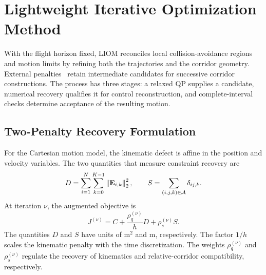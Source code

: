 \section{Lightweight Iterative Optimization Method}
\label{sec:liom}
With the flight horizon fixed, LIOM reconciles local collision-avoidance regions and motion limits by refining both the trajectories and the corridor geometry. External penalties~\cite{li2022liom} retain intermediate candidates for successive corridor constructions. The process has three stages: a relaxed QP supplies a candidate, numerical recovery qualifies it for control reconstruction, and complete-interval checks determine acceptance of the resulting motion.

\subsection{Two-Penalty Recovery Formulation}
For the Cartesian motion model, the kinematic defect is affine in the position and velocity variables. The two quantities that measure constraint recovery are
\begin{equation}
 D=\sum_{i=1}^N\sum_{k=0}^{K-1}\left\lVert \mathbf E_{i,k}\right\rVert_2^2,\qquad
 S=\sum_{(i,j,k)\in\mathcal A}\delta_{ij,k}.
 \label{eq:recovery}
\end{equation}
At iteration $\nu$, the augmented objective is
\begin{equation}
 J^{(\nu)}=C+\frac{\rho_q^{(\nu)}}hD+\rho_s^{(\nu)}S.
 \label{eq:penalty}
\end{equation}
The quantities $D$ and $S$ have units of $\mathrm{m}^2$ and $\mathrm{m}$, respectively. The factor $1/h$ scales the kinematic penalty with the time discretization. The weights $\rho_q^{(\nu)}$ and $\rho_s^{(\nu)}$ regulate the recovery of kinematics and relative-corridor compatibility, respectively.

